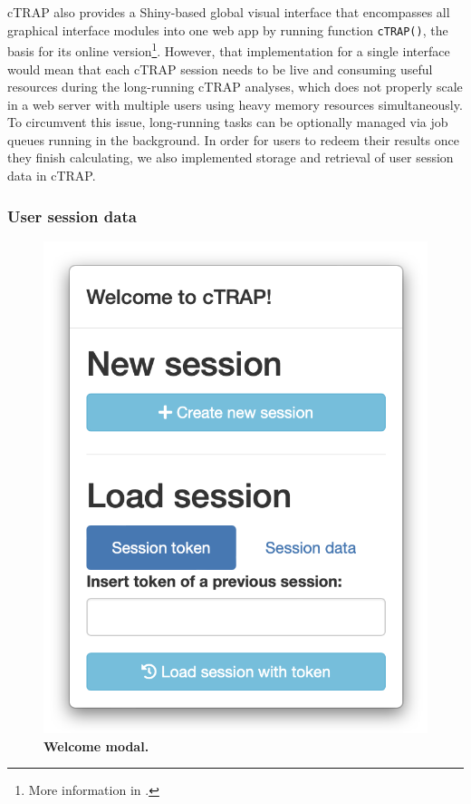 cTRAP also provides a Shiny-based global visual interface that encompasses all graphical interface modules into one web app by running function \texttt{cTRAP()}, the basis for its online version\footnote{More information in .}. However, that implementation for a single interface would mean that each cTRAP session needs to be live and consuming useful resources during the long-running cTRAP analyses, which does not properly scale in a web server with multiple users using heavy memory resources simultaneously. To circumvent this issue, long-running tasks can be optionally managed via job queues running in the background. In order for users to redeem their results once they finish calculating, we also implemented storage and retrieval of user session data in cTRAP.

\subsubsection{User session data}
\label{sec:ctrap-web}

\begin{figure}
  \vspace{-2\intextsep}
  \includegraphics[width=\linewidth]{images/ctrap/welcome}
  \caption[Welcome screen modal]{\textbf{Welcome modal.}}
  \vspace{-1\intextsep}
  \label{fig:ctrap-welcome}
\end{figure}


